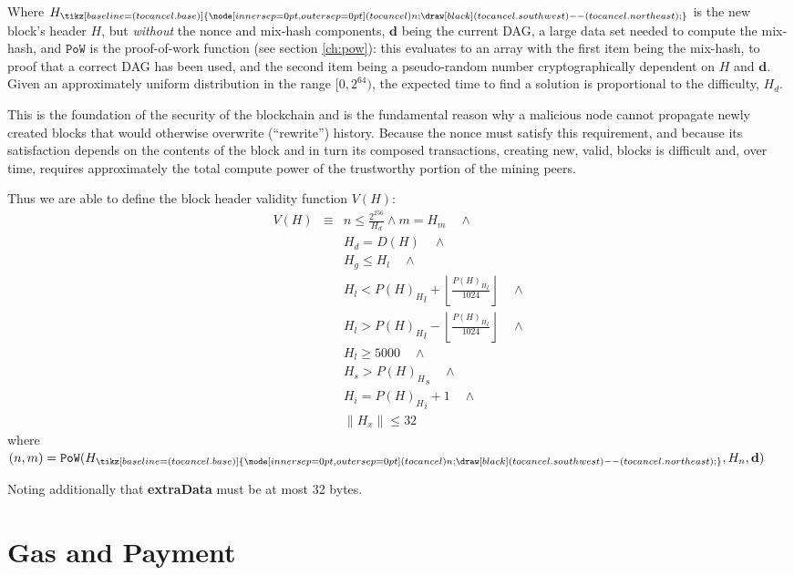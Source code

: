 \documentclass[9pt,oneside]{amsart}
\newcommand{\hcancel}[1]{%
    \tikz[baseline=(tocancel.base)]{
        \node[inner sep=0pt,outer sep=0pt] (tocancel) {#1};
        \draw[black] (tocancel.south west) -- (tocancel.north east);
    }%
}%
\begin{document}
\begin{multicols}{2}
Where $H_{\hcancel{n}}$ is the new block's header $H$, but \textit{without} the nonce and mix-hash components, $\mathbf{d}$ being the current DAG, a large data set needed to compute the mix-hash, and $\mathtt{PoW}$ is the proof-of-work function (see section \ref{ch:pow}): this evaluates to an array with the first item being the mix-hash, to proof that a correct DAG has been used, and the second item being a pseudo-random number cryptographically dependent on $H$ and $\mathbf{d}$. Given an approximately uniform distribution in the range $[0, 2^{64})$, the expected time to find a solution is proportional to the difficulty, $H_d$.

This is the foundation of the security of the blockchain and is the fundamental reason why a malicious node cannot propagate newly created blocks that would otherwise overwrite (``rewrite'') history. Because the nonce must satisfy this requirement, and because its satisfaction depends on the contents of the block and in turn its composed transactions, creating new, valid, blocks is difficult and, over time, requires approximately the total compute power of the trustworthy portion of the mining peers.

Thus we are able to define the block header validity function $V(H)$:
\begin{eqnarray}
V(H) & \equiv &  n \leqslant \frac{2^{256}}{H_d} \wedge m = H_m \quad \wedge \\
& & H_d = D(H) \quad \wedge \\
& & H_g \le H_l  \quad \wedge \\
& & H_l < {P(H)_H}_l + \left\lfloor\frac{{P(H)_H}_l}{1024}\right\rfloor  \quad \wedge \\
& & H_l > {P(H)_H}_l - \left\lfloor\frac{{P(H)_H}_l}{1024}\right\rfloor  \quad \wedge \\
& & H_l \geqslant 5000  \quad \wedge \\
& & H_s > {P(H)_H}_s \quad \wedge \\
& & H_i = {P(H)_H}_i +1 \quad \wedge \\
& & \lVert H_x \rVert \le 32
\end{eqnarray}
where $(n, m) = \mathtt{PoW}(H_{\hcancel{n}}, H_n, \mathbf{d})$

Noting additionally that \textbf{extraData} must be at most 32 bytes.

\section{Gas and Payment} \label{ch:payment}


\end{multicols}
\end{document}
